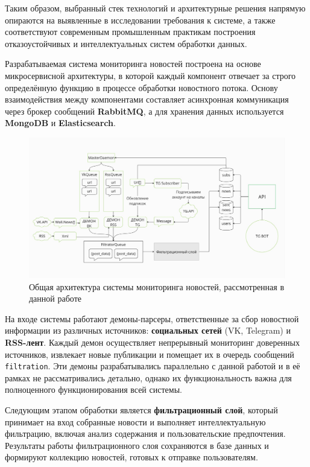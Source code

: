 Таким образом, выбранный стек технологий и архитектурные решения напрямую опираются на выявленные в исследовании требования к системе, а также соответствуют современным промышленным практикам построения отказоустойчивых и интеллектуальных систем обработки данных.

Разрабатываемая система мониторинга новостей построена на основе микросервисной архитектуры, в которой каждый компонент отвечает за строго определённую функцию в процессе обработки новостного потока.
Основу взаимодействия между компонентами составляет асинхронная коммуникация через брокер сообщений \textbf{RabbitMQ}, а для хранения данных используется \textbf{MongoDB} и \textbf{Elasticsearch}.

\begin{figure}[H]
    \centering
    \includegraphics[width=150mm]{images/all_process}
    \caption{Общая архитектура системы мониторинга новостей, рассмотренная в данной работе}
    \label{fig:all_process}
\end{figure}

На входе системы работают демоны-парсеры, ответственные за сбор новостной информации из различных источников: \textbf{социальных сетей} (VK, Telegram) и \textbf{RSS-лент}.
Каждый демон осуществляет непрерывный мониторинг доверенных источников, извлекает новые публикации и помещает их в очередь сообщений \texttt{filtration}.
Эти демоны разрабатывались параллельно с данной работой и в её рамках не рассматривались детально, однако их функциональность важна для полноценного функционирования всей системы.

Следующим этапом обработки является \textbf{фильтрационный слой}, который принимает на вход собранные новости и выполняет интеллектуальную фильтрацию, включая анализ содержания и пользовательские предпочтения.
Результаты работы фильтрационного слоя сохраняются в базе данных и формируют коллекцию новостей, готовых к отправке пользователям.

